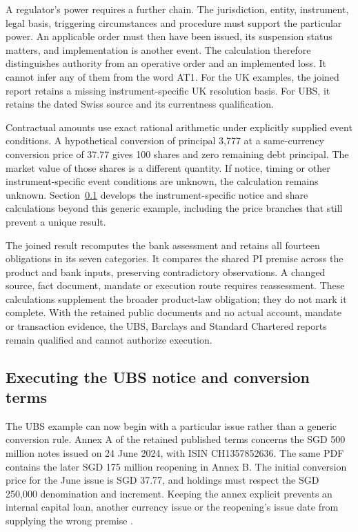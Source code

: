 \documentclass[12pt,a4paper,oneside,openany]{book}
\begin{document}
A regulator's power requires a further chain. The jurisdiction, entity,
instrument, legal basis, triggering circumstances and procedure must support
the particular power. An applicable order must then have been issued, its
suspension status matters, and implementation is another event. The calculation
therefore distinguishes authority from an operative order and an implemented
loss. It cannot infer any of them from the word AT1. For the UK examples, the
joined report retains a missing instrument-specific UK resolution basis. For
UBS, it retains the dated Swiss source and its currentness qualification.

Contractual amounts use exact rational arithmetic under explicitly supplied
event conditions. A hypothetical conversion of principal 3,777 at a
same-currency conversion price of 37.77 gives 100 shares and zero remaining
debt principal. The market value of those shares is a different quantity.
If notice, timing or other instrument-specific event conditions are unknown,
the calculation remains unknown. Section~\ref{sec:ubs-terms} develops the
instrument-specific notice and share calculations beyond this generic example,
including the price branches that still prevent a unique result.

The joined result recomputes the bank assessment and retains all fourteen
obligations in its seven categories. It compares the shared PI premise across
the product and bank inputs, preserving contradictory observations. A changed
source, fact document, mandate or execution route requires reassessment.
These calculations supplement the broader product-law obligation; they do not
mark it complete. With the retained public documents and no actual account,
mandate or transaction evidence, the UBS, Barclays and Standard Chartered
reports remain qualified and cannot authorize execution.


\subsection{Executing the UBS notice and conversion terms}
\label{sec:ubs-terms}

The UBS example can now begin with a particular issue rather than a generic
conversion rule. Annex A of the retained published terms concerns the
SGD 500 million notes issued on 24 June 2024, with ISIN CH1357852636.
The same PDF contains the later SGD 175 million reopening in Annex B.
The initial conversion price for the June issue is SGD 37.77, and holdings
must respect the SGD 250,000 denomination and increment. Keeping the annex
explicit prevents an internal capital loan, another currency issue or the
reopening's issue date from supplying the wrong premise
\citep[Annex A, definitions and condition~2]{ubsat12024}.
\end{document}
